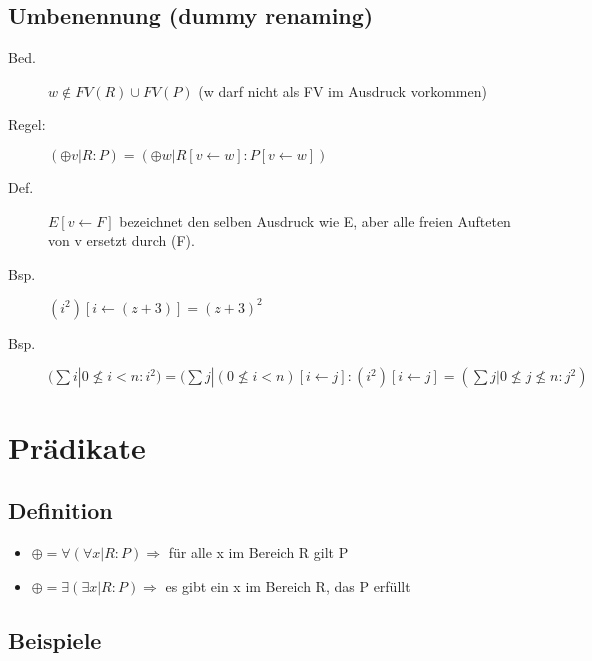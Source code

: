 \documentclass[a4paper,10pt]{article}
\newcommand{\la}{\leftarrow}
\begin{document}
\subsection{Umbenennung (dummy renaming)}
\begin{description}
	\item[Bed.] $w \notin FV(R) \cup FV(P)$ (w darf nicht als FV im Ausdruck vorkommen)
	\item[Regel:] $(\oplus v | R : P) = (\oplus w | R[v \la w] : P[v \la w])$
	\item[Def.] $E[v \la F]$ bezeichnet den selben Ausdruck wie E, aber alle freien Aufteten von v ersetzt durch (F).
	\item[Bsp.] $(i^2)[i \la (z+3)] = (z+3)^2$
	\item[Bsp.] $(\sum i | 0 \nleq i < n : i^2) = (\sum j | (0 \nleq i < n)[i \la j] : (i^2)[i \la j] = (\sum j | 0 \nleq j \nleq n : j^2)$
\end{description}




\newpage
\section{Pr\"adikate}

\subsection{Definition}
\begin{itemize}
	\item $ \oplus =\forall  (\forall x | R:P) \Longrightarrow$ f\"ur alle x im Bereich R gilt P
	\item $ \oplus =\exists  (\exists x | R:P) \Longrightarrow$ es gibt ein x im Bereich R, das P erf\"ullt
\end{itemize}

\subsection{Beispiele}
\end{document}
